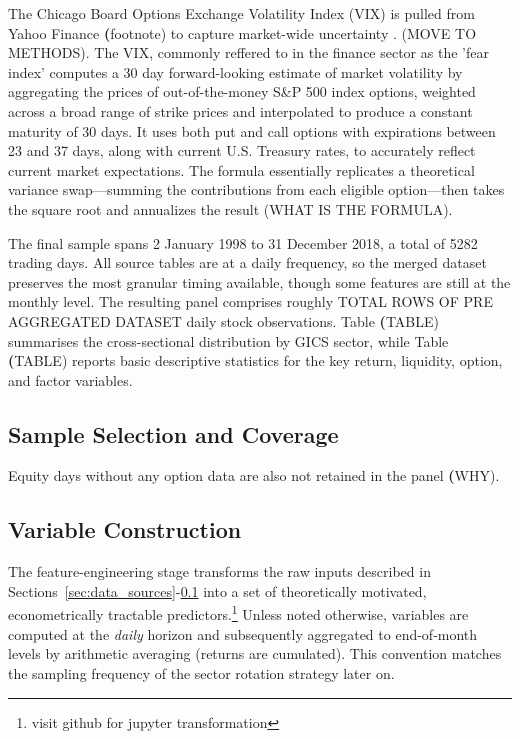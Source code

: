  The Chicago Board Options Exchange Volatility Index (VIX) is pulled from Yahoo Finance \textbf(footnote) to capture market-wide uncertainty \cite{vix_cboe}. (MOVE TO METHODS). The VIX, commonly reffered to in the finance sector as the 'fear index' computes a 30 day forward-looking estimate of market volatility by aggregating the prices of out-of-the-money S\&P 500 index options, weighted across a broad range of strike prices and interpolated to produce a constant maturity of 30 days. It uses both put and call options with expirations between 23 and 37 days, along with current U.S. Treasury rates, to accurately reflect current market expectations. The formula essentially replicates a theoretical variance swap—summing the contributions from each eligible option—then takes the square root and annualizes the result (WHAT IS THE FORMULA). 
 
The final sample spans 2 January 1998 to 31 December 2018, a total of 5282 trading days. All source tables are at a daily frequency, so the merged dataset preserves the most granular timing available, though some features are still at the monthly level. The resulting panel comprises roughly {TOTAL ROWS OF PRE AGGREGATED DATASET} daily stock observations. Table \textbf(TABLE) summarises the cross-sectional distribution by GICS sector, while Table \textbf(TABLE) reports basic descriptive statistics for the key return, liquidity, option, and factor variables. 

\subsection{Sample Selection and Coverage}\label{sec:sample_selection}
 

Equity days without any option data are also not retained in the panel \textbf(WHY).



\subsection{Variable Construction}\label{sec:var_construct}

The feature-engineering stage transforms the raw inputs described in Sections~\ref{sec:data_sources}-\ref{sec:sample_selection} into a set of theoretically motivated, econometrically tractable predictors.\footnote{visit github for jupyter transformation}  Unless noted otherwise, variables are computed at the \emph{daily} horizon and subsequently aggregated to end-of-month levels by arithmetic averaging (returns are cumulated). This convention matches the sampling frequency of the sector rotation strategy later on.


